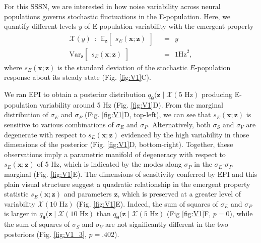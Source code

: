 \documentclass[11pt]{article}
\begin{document}
For this SSSN, we are interested in how noise variability across neural populations governs stochastic fluctuations in the E-population.
Here, we quantify different levels $y$ of E-population variability with the emergent property
\begin{equation}\label{eq:EP_V1}
\begin{split}
\mathcal{X}(y) ~~:~~  \mathbb{E}_{\mathbf{z}}\begin{bmatrix} s_E(\mathbf{x}; \mathbf{z}) \end{bmatrix}  &~~=~~ y \\ 
 \text{Var}_{\mathbf{z}}\begin{bmatrix} s_E(\mathbf{x}; \mathbf{z}) \end{bmatrix}  &~~=~~  1 \text{Hz}^2,
\end{split}
\end{equation}
where $s_E(\mathbf{x}; \mathbf{z})$ is the standard deviation of the stochastic $E$-population response about its steady state (Fig. \ref{fig:V1}C).

We ran EPI to obtain a posterior distribution $q_{\bm{\theta}}(\mathbf{z} \mid \mathcal{X}(5\text{ Hz})$ producing E-population variability around 5 Hz (Fig. \ref{fig:V1}D).
From the marginal distribution of $\sigma_E$ and $\sigma_P$ (Fig. \ref{fig:V1}D, top-left), we can see that $s_E(\mathbf{x}; \mathbf{z})$ is sensitive to various combinations of $\sigma_E$ and $\sigma_P$.
Alternatively, both $\sigma_S$ and $\sigma_V$ are degenerate with respect to $s_E(\mathbf{x}; \mathbf{z})$ evidenced by the high variability in those dimensions of the posterior (Fig. \ref{fig:V1}D, bottom-right).
Together, these observations imply a parametric manifold of degeneracy with respect to $s_E(\mathbf{x}; \mathbf{z})$ of 5 Hz, which is indicated by the modes along $\sigma_P$ in the $\sigma_E$-$\sigma_P$ marginal (Fig. \ref{fig:V1}E).
The dimensions of sensitivity conferred by EPI and this plain visual structure suggest a quadratic relationship in the emergent property statistic $s_E(\mathbf{x}; \mathbf{z})$ and parameters $\mathbf{z}$, which is preserved at a greater level of variability $\mathcal{X}(10\text{ Hz})$ (Fig. \ref{fig:V1}E).
Indeed, the sum of squares of $\sigma_E$ and $\sigma_P$ is larger in $q_{\bm{\theta}}(\mathbf{z} \mid \mathcal{X}(10\text{ Hz})$ than $q_{\bm{\theta}}(\mathbf{z} \mid \mathcal{X}(5\text{ Hz})$ (Fig \ref{fig:V1}F, $p=0$), while the sum of squares of $\sigma_S$ and $\sigma_V$ are not significantly different in the two posteriors (Fig. \ref{fig:V1_3}, $p=.402$).
\end{document}
